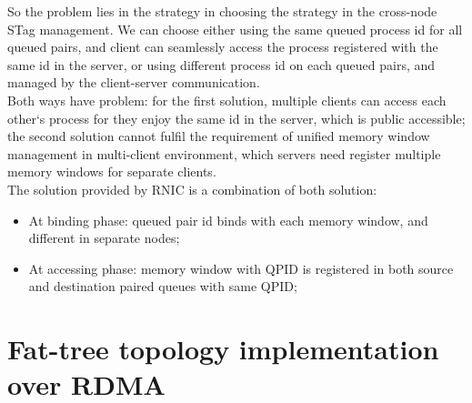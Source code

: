 \documentclass[11pt,openright,a4paper]{report}
\begin{document}
So the problem lies in the strategy in choosing the strategy in the cross-node STag management. We can choose either using the same queued process id for all queued pairs, and client can seamlessly access the process registered with the same id in the server, or using different process id on each queued pairs, and managed by the client-server communication.\\
Both ways have problem: for the first solution, multiple clients can access each other`s process for they enjoy the same id in the server, which is public accessible; the second solution cannot fulfil the requirement of unified memory window management in multi-client environment, which servers need register multiple memory windows for separate clients.\\
The solution provided by RNIC is a combination of both solution:
\begin{itemize}
	\item At binding phase: queued pair id binds with each memory window, and different in separate nodes;
    \item At accessing phase: memory window with QPID is registered in both source and destination paired queues with same QPID;
\end{itemize}
\section{Fat-tree topology implementation over RDMA}
\end{document}
